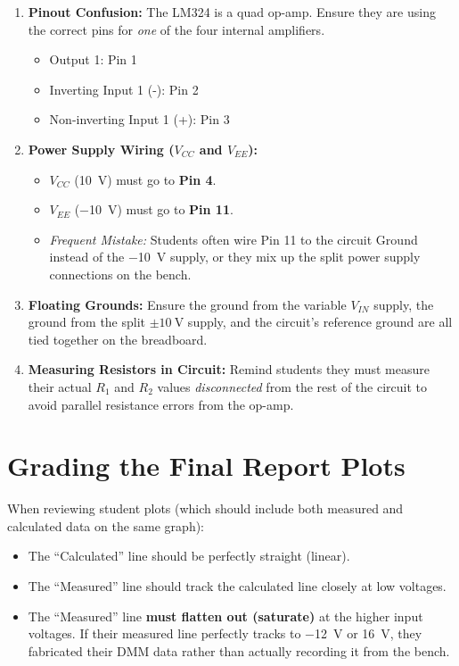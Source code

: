 \documentclass[11pt]{article}
\begin{document}
\begin{enumerate}
  \item \textbf{Pinout Confusion:} The LM324 is a quad op-amp. Ensure they are using the correct pins for \textit{one} of the four internal amplifiers.
    \begin{itemize}
      \item Output 1: Pin 1
      \item Inverting Input 1 (-): Pin 2
      \item Non-inverting Input 1 (+): Pin 3
    \end{itemize}
  \item \textbf{Power Supply Wiring ($V_{CC}$ and $V_{EE}$):}
    \begin{itemize}
      \item $V_{CC}$ (\SI{+10}{\volt}) must go to \textbf{Pin 4}.
      \item $V_{EE}$ (\SI{-10}{\volt}) must go to \textbf{Pin 11}.
      \item \textit{Frequent Mistake:} Students often wire Pin 11 to the circuit Ground instead of the \SI{-10}{\volt} supply, or they mix up the split power supply connections on the bench.
    \end{itemize}
  \item \textbf{Floating Grounds:} Ensure the ground from the variable $V_{IN}$ supply, the ground from the split $\pm\SI{10}{\volt}$ supply, and the circuit's reference ground are all tied together on the breadboard.
  \item \textbf{Measuring Resistors in Circuit:} Remind students they must measure their actual $R_1$ and $R_2$ values \textit{disconnected} from the rest of the circuit to avoid parallel resistance errors from the op-amp.
\end{enumerate}

\vspace{0.2in}
\section*{Grading the Final Report Plots}
When reviewing student plots (which should include both measured and calculated data on the same graph):
\begin{itemize}
  \item The ``Calculated'' line should be perfectly straight (linear).
  \item The ``Measured'' line should track the calculated line closely at low voltages.
  \item The ``Measured'' line \textbf{must flatten out (saturate)} at the higher input voltages. If their measured line perfectly tracks to \SI{-12}{\volt} or \SI{+16}{\volt}, they fabricated their DMM data rather than actually recording it from the bench.
\end{itemize}
\end{document}
